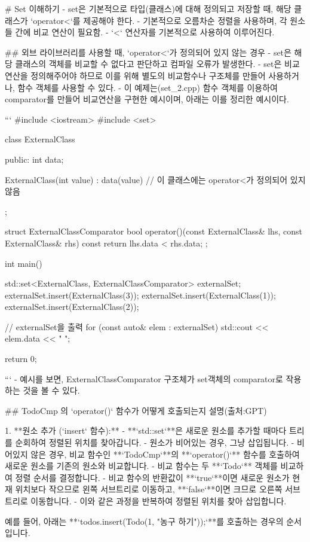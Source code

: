 # Set 이해하기
- set은 기본적으로 타입(클래스)에 대해 정의되고 저장할 때, 해당 클래스가 `operator<`를 제공해야 한다.
- 기본적으로 오름차순 정렬을 사용하며, 각 원소들 간에 비교 연산이 필요함.
- `<` 연산자를 기본적으로 사용하여 이루어진다.

## 외브 라이브러리를 사용할 때, `operator<`가 정의되어 있지 않는 경우
- set은 해당 클래스의 객체를 비교할 수 없다고 판단하고 컴파일 오류가 발생한다.
- set은 비교 연산을 정의해주어야 하므로 이를 위해 별도의 비교함수나 구조체를 만들어 사용하거나, 함수 객체를 사용할 수 있다.
- 이 예제는(set_2.cpp) 함수 객체를 이용하여 comparator를 만들어 비교연산을 구현한 예시이며, 아래는 이를 정리한 예시이다.

```
#include <iostream>
#include <set>

class ExternalClass {
public:
    int data;

    ExternalClass(int value) : data(value) {}
    // 이 클래스에는 operator<가 정의되어 있지 않음
};

struct ExternalClassComparator {
    bool operator()(const ExternalClass& lhs, const ExternalClass& rhs) const {
        return lhs.data < rhs.data;
    }
};

int main() {
    std::set<ExternalClass, ExternalClassComparator> externalSet;
    externalSet.insert(ExternalClass(3));
    externalSet.insert(ExternalClass(1));
    externalSet.insert(ExternalClass(2));

    // externalSet을 출력
    for (const auto& elem : externalSet) {
        std::cout << elem.data << " ";
    }

    return 0;
}
```
- 예시를 보면, ExternalClassComparator 구조체가 set객체의 comparator로 작용하는 것을 볼 수 있다.

## TodoCmp 의 `operator()` 함수가 어떻게 호출되는지 설명(출처:GPT)

1. **원소 추가 (`insert` 함수):**
    - **`std::set`**은 새로운 원소를 추가할 때마다 트리를 순회하여 정렬된 위치를 찾아갑니다.
    - 원소가 비어있는 경우, 그냥 삽입됩니다.
    - 비어있지 않은 경우, 비교 함수인 **`TodoCmp`**의 **`operator()`** 함수를 호출하여 새로운 원소를 기존의 원소와 비교합니다.
    - 비교 함수는 두 **`Todo`** 객체를 비교하여 정렬 순서를 결정합니다.
    - 비교 함수의 반환값이 **`true`**이면 새로운 원소가 현재 위치보다 작으므로 왼쪽 서브트리로 이동하고, **`false`**이면 크므로 오른쪽 서브트리로 이동합니다.
    - 이와 같은 과정을 반복하여 정렬된 위치를 찾아 삽입합니다.

예를 들어, 아래는 **`todos.insert(Todo(1, "농구 하기"));`**를 호출하는 경우의 순서입니다.

